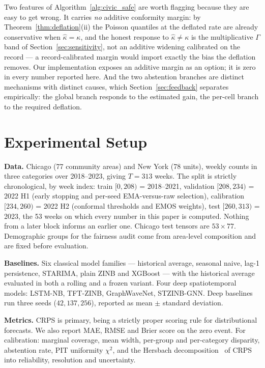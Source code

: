 \documentclass[journal,10pt,twocolumn]{IEEEtran}
\begin{document}
Two features of Algorithm~\ref{alg:civic_safe} are worth flagging because they are
easy to get wrong. It carries \emph{no} additive conformity margin: by
Theorem~\ref{thm:deflation}(ii) the Poisson quantiles at the deflated rate are
already conservative when $\hat\kappa = \kappa$, and the honest response to
$\hat\kappa \ne \kappa$ is the multiplicative $\Gamma$ band of
Section~\ref{sec:sensitivity}, not an additive widening calibrated on the
record --- a record-calibrated margin would import exactly the bias the deflation
removes. Our implementation exposes an additive margin as an option; it is zero in
every number reported here. And the two abstention branches are distinct
mechanisms with distinct causes, which Section~\ref{sec:feedback} separates
empirically: the global branch responds to the estimated gain, the per-cell branch
to the required deflation.

\section{Experimental Setup}
\textbf{Data.} Chicago (77 community areas) and New York (78 units), weekly
counts in three categories over 2018--2023, giving $T = 313$ weeks. The split is
strictly chronological, by week index: train $[0, 208)$ = 2018--2021, validation
$[208, 234)$ = 2022 H1 (early stopping and per-seed EMA-versus-raw selection),
calibration $[234, 260)$ = 2022 H2 (conformal thresholds and EMOS weights), test
$[260, 313)$ = 2023, the 53 weeks on which every number in this paper is
computed. Nothing from a later block informs an earlier one. Chicago test tensors
are $53 \times 77$. Demographic groups for the fairness audit come from
area-level composition and are fixed before evaluation.

\textbf{Baselines.} Six classical model families --- historical average, seasonal
naive, lag-1 persistence, STARIMA, plain ZINB and XGBoost --- with the historical
average evaluated in both a rolling and a frozen variant. Four deep
spatiotemporal models: LSTM-NB, TFT-ZINB, GraphWaveNet, STZINB-GNN. Deep
baselines run three seeds ($42, 137, 256$), reported as mean $\pm$ standard
deviation.

\textbf{Metrics.} CRPS is primary, being a strictly proper scoring rule for
distributional forecasts. We also report MAE, RMSE and Brier score on the zero
event. For calibration: marginal coverage, mean width, per-group and per-category
disparity, abstention rate, PIT uniformity $\chi^2$, and the Hersbach
decomposition~\cite{hersbach2000decomposition} of CRPS into reliability,
resolution and uncertainty.
\end{document}
